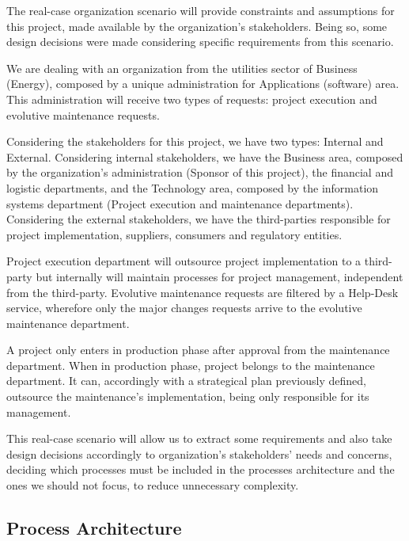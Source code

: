 The real-case organization scenario will provide constraints and assumptions for this project, made available by the organization's stakeholders. Being so, some design decisions were made considering specific requirements from this scenario.\par
We are dealing with an organization from the utilities sector of Business (Energy), composed by a unique administration for Applications (software) area. This administration will receive two types of requests: project execution and evolutive maintenance requests.\par
Considering the stakeholders for this project, we have two types: Internal and External. Considering internal stakeholders, we have the Business area, composed by the organization's administration (Sponsor of this project), the financial and logistic departments, and the Technology area, composed by the information systems department (Project execution and maintenance departments). Considering the external stakeholders, we have the third-parties responsible for project implementation, suppliers, consumers and regulatory entities.\par
Project execution department will outsource project implementation to a third-party but internally will maintain processes for project management, independent from the third-party. Evolutive maintenance requests are filtered by a Help-Desk service, wherefore only the major changes requests arrive to the evolutive maintenance department.\par
A project only enters in production phase after approval from the maintenance department. When in production phase, project belongs to the maintenance department. It can, accordingly with a strategical plan previously defined, outsource the maintenance's implementation, being only responsible for its management.\par
This real-case scenario will allow us to extract some requirements and also take design decisions accordingly to organization's stakeholders' needs and concerns, deciding which processes must be included in the processes architecture and the ones we should not focus, to reduce unnecessary complexity.\par


\subsection{Process Architecture}


